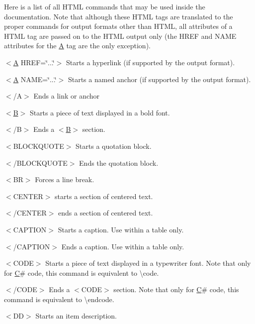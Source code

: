 Here is a list of all H\+T\+ML commands that may be used inside the documentation. Note that although these H\+T\+ML tags are translated to the proper commands for output formats other than H\+T\+ML, all attributes of a H\+T\+ML tag are passed on to the H\+T\+ML output only (the {\ttfamily H\+R\+EF} and {\ttfamily N\+A\+ME} attributes for the {\ttfamily \mbox{\hyperlink{class_a}{A}}} tag are the only exception).


\begin{DoxyItemize}
\item {\ttfamily $<$\mbox{\hyperlink{class_a}{A}} H\+R\+EF=\char`\"{}...\char`\"{}$>$} Starts a hyperlink (if supported by the output format). 
\item {\ttfamily $<$\mbox{\hyperlink{class_a}{A}} N\+A\+ME=\char`\"{}...\char`\"{}$>$} Starts a named anchor (if supported by the output format). 
\item {\ttfamily $<$/A$>$} Ends a link or anchor 
\item {\ttfamily $<$\mbox{\hyperlink{class_b}{B}}$>$} Starts a piece of text displayed in a bold font. 
\item {\ttfamily $<$/B$>$} Ends a {\ttfamily $<$\mbox{\hyperlink{class_b}{B}}$>$} section. 
\item {\ttfamily $<$B\+L\+O\+C\+K\+Q\+U\+O\+TE$>$} Starts a quotation block. 
\item {\ttfamily $<$/\+B\+L\+O\+C\+K\+Q\+U\+O\+TE$>$} Ends the quotation block. 
\item {\ttfamily $<$BR$>$} Forces a line break. 
\item {\ttfamily $<$C\+E\+N\+T\+ER$>$} starts a section of centered text. 
\item {\ttfamily $<$/\+C\+E\+N\+T\+ER$>$} ends a section of centered text. 
\item {\ttfamily $<$C\+A\+P\+T\+I\+ON$>$} Starts a caption. Use within a table only. 
\item {\ttfamily $<$/\+C\+A\+P\+T\+I\+ON$>$} Ends a caption. Use within a table only. 
\item {\ttfamily $<$C\+O\+DE$>$} Starts a piece of text displayed in a typewriter font. Note that only for \mbox{\hyperlink{class_c}{C}}\# code, this command is equivalent to \textbackslash{}code. 
\item {\ttfamily $<$/\+C\+O\+DE$>$} Ends a {\ttfamily $<$C\+O\+DE$>$} section. Note that only for \mbox{\hyperlink{class_c}{C}}\# code, this command is equivalent to \textbackslash{}endcode. 
\item {\ttfamily $<$DD$>$} Starts an item description. 

\end{DoxyItemize}
